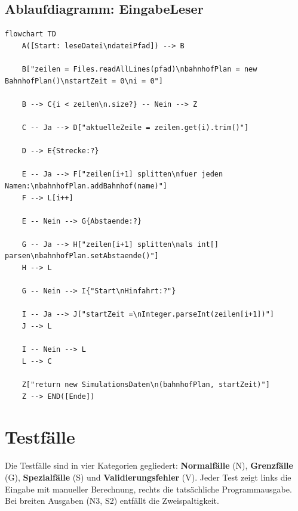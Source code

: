 \documentclass[12pt,a4paper]{article}
\begin{document}
\subsection{Ablaufdiagramm: EingabeLeser}

\begin{lstlisting}[style=mermaid, caption={Flussdiagramm -- EingabeLeser.leseDatei()}]
flowchart TD
    A([Start: leseDatei\ndateiPfad]) --> B

    B["zeilen = Files.readAllLines(pfad)\nbahnhofPlan = new BahnhofPlan()\nstartZeit = 0\ni = 0"]

    B --> C{i < zeilen\n.size?} -- Nein --> Z

    C -- Ja --> D["aktuelleZeile = zeilen.get(i).trim()"]

    D --> E{Strecke:?}

    E -- Ja --> F["zeilen[i+1] splitten\nfuer jeden Namen:\nbahnhofPlan.addBahnhof(name)"]
    F --> L[i++]

    E -- Nein --> G{Abstaende:?}

    G -- Ja --> H["zeilen[i+1] splitten\nals int[] parsen\nbahnhofPlan.setAbstaende()"]
    H --> L

    G -- Nein --> I{"Start\nHinfahrt:?"}

    I -- Ja --> J["startZeit =\nInteger.parseInt(zeilen[i+1])"]
    J --> L

    I -- Nein --> L
    L --> C

    Z["return new SimulationsDaten\n(bahnhofPlan, startZeit)"]
    Z --> END([Ende])
\end{lstlisting}


\section{Testfälle}
\label{sec:tests}

Die Testfälle sind in vier Kategorien gegliedert: \textbf{Normalfälle} (N), \textbf{Grenzfälle} (G),
\textbf{Spezialfälle} (S) und \textbf{Validierungsfehler} (V).
Jeder Test zeigt links die Eingabe mit manueller Berechnung, rechts die tatsächliche Programmausgabe.
Bei breiten Ausgaben (N3, S2) entfällt die Zweispaltigkeit.
\end{document}
